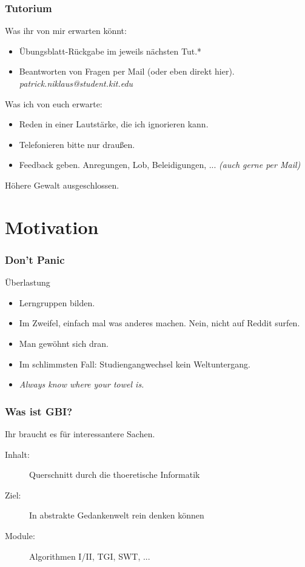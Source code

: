 \documentclass{beamer}
\begin{document}
\begin{frame}
  \frametitle{Tutorium}
  \begin{block}{Was ihr von mir erwarten könnt:}
    \begin{itemize}
      \item Übungsblatt-Rückgabe im jeweils nächsten Tut.*
      \item Beantworten von Fragen per Mail (oder eben direkt hier). {\small \emph{patrick.niklaus@student.kit.edu}}
    \end{itemize}
  \end{block}
    \begin{block}{Was ich von euch erwarte:}
    \begin{itemize}
      \item Reden in einer Lautstärke, die ich ignorieren kann.
      \item Telefonieren bitte nur draußen.
      \item Feedback geben. Anregungen, Lob, Beleidigungen, ... \emph{(auch gerne per Mail)}
    \end{itemize}
  \end{block}
  \footnotesize *Höhere Gewalt ausgeschlossen.
\end{frame}

\section{Motivation}
\begin{frame}
  \frametitle{Don't Panic}
  \begin{block}{Überlastung}
    \begin{itemize}
      \item Lerngruppen bilden.
      \item Im Zweifel, einfach mal was anderes machen. {\tiny Nein, nicht auf Reddit surfen.}
      \item Man gewöhnt sich dran.
      \item Im schlimmsten Fall: Studiengangwechsel kein Weltuntergang.
      \item\textit{Always know where your towel is.}
    \end{itemize}
  \end{block}
\end{frame}
\begin{frame}
  \frametitle{Was ist GBI?}
  \begin{block}{Ihr braucht es für interessantere Sachen.}
    \begin{description}
      \item[Inhalt:] Querschnitt durch die thoeretische Informatik
      \item[Ziel:] In abstrakte Gedankenwelt rein denken können
      \item[Module:] Algorithmen I/II, TGI, SWT, ...
    \end{description}
  \end{block}
\end{frame}
\end{document}
